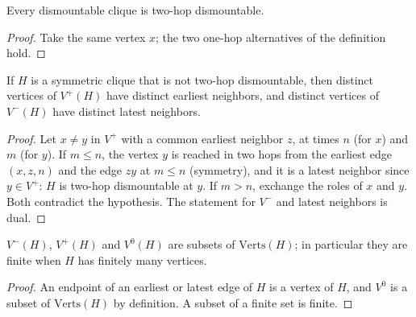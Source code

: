 \begin{lemma}
  \label{lem:twoHop-of-dismountable}
  \leanok
  Every dismountable clique is two-hop dismountable.
\end{lemma}

\begin{proof}
  \leanok
  Take the same vertex $x$; the two one-hop alternatives of the definition hold.
\end{proof}

\begin{lemma}
  \label{lem:vplus-vminus-not-neighbors}
  \leanok
  If $H$ is a symmetric clique that is not two-hop dismountable, then
  distinct vertices of $V^+(H)$ have distinct earliest neighbors, and
  distinct vertices of $V^-(H)$ have distinct latest neighbors.
\end{lemma}

\begin{proof}
  \leanok
  Let $x \neq y$ in $V^+$ with a common earliest neighbor $z$, at times $n$ (for $x$) and $m$ (for $y$). If $m \le n$, the vertex $y$ is reached in two hops from the earliest edge $(x,z,n)$ and the edge $zy$ at $m \le n$ (symmetry), and it is a latest neighbor since $y \in V^+$: $H$ is two-hop dismountable at $y$. If $m > n$, exchange the roles of $x$ and $y$. Both contradict the hypothesis. The statement for $V^-$ and latest neighbors is dual.
\end{proof}

\begin{lemma}
  \label{lem:partition-finite}
  \leanok
  $V^-(H)$, $V^+(H)$ and $V^0(H)$ are subsets of $\mathrm{Verts}(H)$; in
  particular they are finite when $H$ has finitely many vertices.
\end{lemma}

\begin{proof}
  \leanok
  An endpoint of an earliest or latest edge of $H$ is a vertex of $H$, and $V^0$ is a subset of $\mathrm{Verts}(H)$ by definition. A subset of a finite set is finite.
\end{proof}

